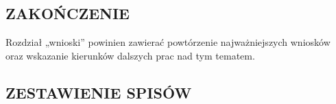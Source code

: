 \documentclass[12pt]{article}
\begin{document}
\subsection*{ZAKOŃCZENIE}
Rozdział „wnioski” powinien zawierać powtórzenie najważniejszych wniosków oraz wskazanie kierunków dalszych prac nad tym tematem.

\newpage


\newpage


\printbibliography[title ={BIBLIOGRAFIA}]

\newpage

\subsection*{ZESTAWIENIE SPISÓW}

\listoftables

\listoffigures


\newpage
\end{document}
